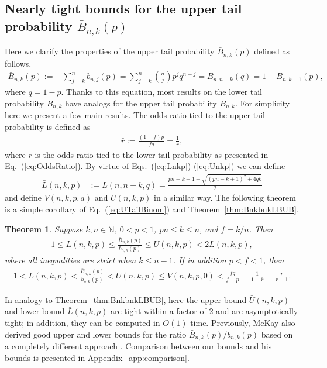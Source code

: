 \documentclass[aop]{imsart}
\theoremstyle{plain}
\newtheorem{theorem}{Theorem}[section]
\theoremstyle{remark}
\newcommand{\bbN}{\mathbb{N}}
\newcommand{\1}{\operatorname{\uppercase\expandafter{\romannumeral1}}}
\newcommand{\2}{\operatorname{\uppercase\expandafter{\romannumeral2}}}
\newcommand{\3}{\operatorname{\uppercase\expandafter{\romannumeral3}}}
\newcommand{\4}{\operatorname{\uppercase\expandafter{\romannumeral4}}}
\newcommand{\5}{\operatorname{\uppercase\expandafter{\romannumeral5}}}
\newcommand{\6}{\operatorname{\uppercase\expandafter{\romannumeral6}}}
\newcommand{\7}{\operatorname{\uppercase\expandafter{\romannumeral7}}}
\newcommand{\8}{\operatorname{\uppercase\expandafter{\romannumeral8}}}
\newcommand{\9}{\operatorname{\uppercase\expandafter{\romannumeral9}}}
\def\eqref#1{\textup{(\ref{#1})}}
\newcommand{\eref}[1]{Eq.~\textup{(\ref{#1})}}
\newcommand{\thref}[1]{Theorem~\ref{#1}}
\newcommand{\aref}[1]{Appendix~\ref{#1}}
\begin{document}
\subsection{Nearly tight bounds for the upper tail probability $\bar{B}_{n,k}(p)$}
Here  we clarify the  properties of the upper tail probability $\bar{B}_{n,k}(p)$ defined as follows,
\begin{align}
\bar{B}_{n,k}(p):=& \sum_{j=k}^nb_{n,j}(p)= \sum_{j=k}^n {n \choose j} p^j q^{n-j}=B_{n,n-k}(q)=1-B_{n,k-1}(p), \label{eq:UTailBinom}
\end{align} 
where $q=1-p$.
Thanks to this equation, 
most results on the lower tail probability $B_{n,k}$ have analogs for the upper tail probability $\bar{B}_{n,k}$. 
For simplicity here we present a few main results. The odds ratio tied to the upper tail probability is defined as  
\begin{align}
\bar{r}:=\frac{(1-f)p }{fq}=\frac{1}{r},
\end{align}
where $r$ is the odds ratio tied to the lower tail probability as presented in \eref{eq:OddsRatio}. By virtue of  Eqs.~\eqref{eq:Lnkp}-\eqref{eq:Unkp} we can 
define
\begin{align}
\bar{L}(n,k,p)&:=L(n,n-k,q)=\frac{p n-k+1+\sqrt{(p n-k+1)^2+4q k}}{2} \label{eq:LnkpBar}
\end{align}
and define $\bar{V}(n,k,p,a)$ and $\bar{U}(n,k,p)$  in a similar way. The following theorem is a simple corollary of  \eref{eq:UTailBinom} and \thref{thm:BnkbnkLBUB}. 
\begin{theorem}\label{thm:BnkbnkLBUBbar}
	Suppose  $k,n\in \bbN$, $0<p<1$,    $p n \leq k\leq n$, and  $f=k/n$. Then 
	\begin{gather}
	1\leq \bar{L}(n,k,p)\leq 	\frac{\bar{B}_{n,k}(p)}{b_{n,k}(p)}\leq \bar{U}(n,k,p)<  2\bar{L}(n,k,p),
	\end{gather}	
where all inequalities are strict when $k\leq n-1$.	If in addition $p<f<1$, then 	
	\begin{gather}		
	1<\bar{L}(n,k,p)<\frac{\bar{B}_{n,k}(p)}{b_{n,k}(p)}< \bar{U}(n,k,p)\leq  \bar{V}(n,k,p,0)< \frac{fq}{f-p}=\frac{1}{1-\bar{r}}=\frac{r}{r-1}.
	\end{gather}
\end{theorem}
In analogy to \thref{thm:BnkbnkLBUB},
here  the upper bound $\bar{U}(n,k,p)$ and lower bound $\bar{L}(n,k,p)$ are tight within a factor of 2 and are  asymptotically tight; in addition, they  can be computed in $O(1)$ time. Previously,  McKay also derived good upper and lower bounds for the ratio $\bar{B}_{n,k}(p)/b_{n,k}(p)$ based on a completely different approach \cite{McKa89}. Comparison 
between our bounds and his bounds is presented in \aref{app:comparison}. 
\end{document}
